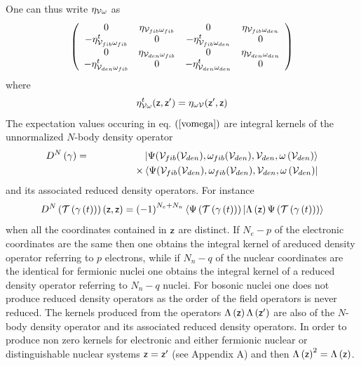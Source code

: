 One can thus write $\eta _{{\cal V\omega }}$ as 
\begin{equation}
\left( 
\begin{array}{cccc}
0 & \eta _{{\cal V}_{fib}\omega _{fib}} & 0 & \eta _{{\cal V}_{fib}\omega
_{den}} \\ 
-\eta _{{\cal V}_{fib}\omega _{fib}}^{t} & 0 & -\eta _{{\cal V}_{fib}\omega
_{den}}^{t} & 0 \\ 
0 & \eta _{{\cal V}_{den}\omega _{fib}} & 0 & \eta _{{\cal V}_{den}\omega
_{den}} \\ 
-\eta _{{\cal V}_{den}\omega _{fib}}^{t} & 0 & -\eta _{{\cal V}_{den}\omega
_{den}}^{t} & 0%
\end{array}%
\right)
\end{equation}%
where 
\begin{equation}
\eta _{{\cal V}\omega }^{t}({\sf z},{\sf z}^{\prime })=\eta _{\omega {\cal V}%
}({\sf z}^{\prime },{\sf z})
\end{equation}%
The expectation values occuring in eq. $\left( \ref{vomega}\right) $ are
integral kernels of the unnormalized $N$-body density operator 
\begin{eqnarray}
D^{N}\left( \gamma \right) &=&\left| \Psi ({\cal V}_{fib}({\cal V}%
_{den}),\omega _{fib}({\cal V}_{den}),{\cal V}_{den},\omega \left( {\cal V}%
_{den}\right) \right\rangle  \nonumber \\
&&\qquad \qquad \times \left\langle \Psi ({\cal V}_{fib}({\cal V}%
_{den}),\omega _{fib}({\cal V}_{den}),{\cal V}_{den},\omega \left( {\cal V}%
_{den}\right) \right|
\end{eqnarray}%
and its associated reduced density operators. For instance 
\begin{equation}
D^{N}\left( {\cal T}\left( \gamma \left( t\right) \right) \right) \left( 
{\sf z},{\sf z}\right) =\left( -1\right) ^{N_{e}+N_{n}}\left\langle \Psi
\left( {\cal T}\left( \gamma \left( t\right) \right) \right) |\Lambda \left( 
{\sf z}\right) \Psi \left( {\cal T}\left( \gamma \left( t\right) \right)
\right) \right\rangle
\end{equation}%
when all the coordinates contained in ${\sf z}$ are distinct. If $N_{e}-p$
of the electronic coordinates are the same then one obtains the integral
kernel of areduced density operator referring to $p$ electrons, while if $%
N_{n}-q$ of the nuclear coordinates are the identical for fermionic nuclei
one obtains the integral kernel of a reduced density operator referring to $%
N_{n}-q$ nuclei. For bosonic nuclei one does not produce reduced density
operators as the order of the field operators is never reduced. The kernels
produced from the operators $\Lambda \left( {\sf z}\right) \Lambda \left( 
{\sf z}^{\prime }\right) $ are also of the $N$-body density operator and its
associated reduced density operators. In order to produce non zero kernels
for electronic and either fermionic nuclear or distinguishable nuclear
systems ${\sf z=z}^{\prime }$ (see Appendix A) and then $\Lambda \left( {\sf %
z}\right) ^{2}=\Lambda \left( {\sf z}\right) $.

